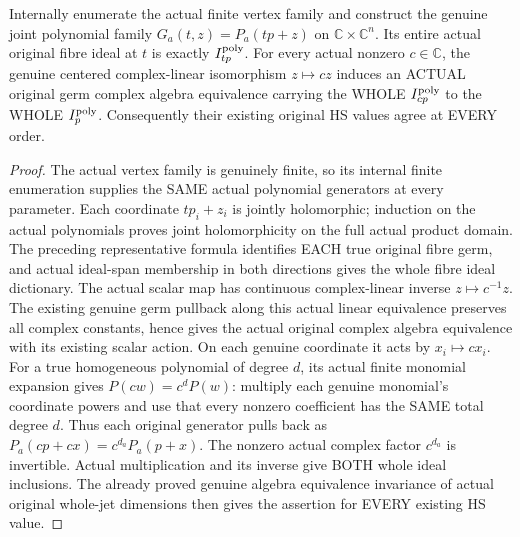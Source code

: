 \begin{theorem}
\label{hir:actual-translated-initial-ray-family-isomorphisms}
Internally enumerate the actual finite vertex family and construct the
genuine joint polynomial family
$G_a(t,z)=P_a(t p+z)$ on $\mathbb C\times\mathbb C^n$.
Its entire actual original fibre ideal at $t$ is exactly
$I_{tp}^{\rm poly}$. For every actual nonzero $c\in\mathbb C$,
the genuine centered complex-linear isomorphism $z\mapsto cz$
induces an ACTUAL original germ complex algebra equivalence carrying
the WHOLE $I_{cp}^{\rm poly}$ to the WHOLE $I_p^{\rm poly}$.
Consequently their existing original HS values agree at EVERY order.
\leanok
\end{theorem}
\begin{proof}
The actual vertex family is genuinely finite, so its internal finite
enumeration supplies the SAME actual polynomial generators at every
parameter. Each coordinate $tp_i+z_i$ is jointly holomorphic; induction
on the actual polynomials proves joint holomorphicity on the full
actual product domain. The preceding representative formula identifies
EACH true original fibre germ, and actual ideal-span membership in both
directions gives the whole fibre ideal dictionary.
The actual scalar map has continuous complex-linear inverse
$z\mapsto c^{-1}z$. The existing genuine germ pullback along this
actual linear equivalence preserves all complex constants, hence gives
the actual original complex algebra equivalence with its existing
scalar action. On each genuine coordinate it acts by $x_i\mapsto cx_i$.
For a true homogeneous polynomial of degree $d$, its actual finite
monomial expansion gives $P(cw)=c^dP(w)$: multiply each genuine
monomial's coordinate powers and use that every nonzero coefficient
has the SAME total degree $d$. Thus each original generator pulls
back as $P_a(cp+cx)=c^{d_a}P_a(p+x)$. The nonzero actual complex
factor $c^{d_a}$ is invertible. Actual multiplication and its inverse
give BOTH whole ideal inclusions. The already proved genuine algebra
equivalence invariance of actual original whole-jet dimensions then
gives the assertion for EVERY existing HS value.
\end{proof}

